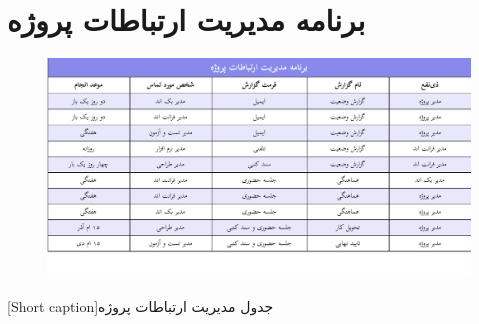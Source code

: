 \section{
برنامه مدیریت ارتباطات پروژه
}

\begin{center}
  \begin{figure} [h!]
    { \includegraphics[page=1, width=\textwidth]{appandecies/communications.pdf}}
  \end{figure}
  [Short caption]{جدول مدیریت ارتباطات پروژه}
\end{center}